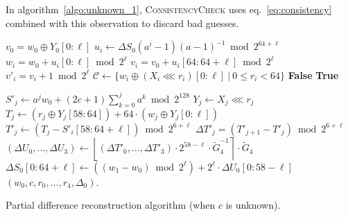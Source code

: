 \documentclass[preprint,svgnames]{iacrtrans}
\begin{document}
In algorithm~\ref{algo:unknown_1}, \textsc{ConsistencyCheck} uses
eq.~\eqref{eq:consistency} combined with this observation to discard bad guesses.

\begin{algorithm}
\begin{algorithmic}[1]
  \State $v_0 = w_0 \oplus Y_0[0:\ell]$ 
  \State $u_i \gets \Delta S_0 (a^i-1)(a-1)^{-1} \bmod 2^{64+\ell}$ 
  \State $w_i = w_0 + u_i[0:\ell] \bmod 2^{\ell}$ 
  \State $v_i = v_0 + u_i[64:64+\ell] \bmod 2^{\ell}$ 
  \State $v'_i = v_i + 1 \bmod 2^{\ell}$
  \State $\mathcal{C} \gets \{ w_i \oplus (X_i \lll r_i)[0:\ell]~|~ 0\leq r_i < 64\}$ 
  \State \Return \textbf{False} 
  \EndIf
  \EndFor
  \State \Return \textbf{True} 
  \EndProcedure

\State 
  
   
  \State $S'_j \gets a^j w_0 + (2c+1) \sum_{k = 0}^j a^k \bmod 2^{128}$ 
   
  \State $Y_j \gets X_j \lll r_j$ 
  \State $T_j \gets \left(r_j \oplus Y_j[58:64]\right) +  64 \cdot \left(w_j \oplus Y_j[0:\ell]\right)$ 
  \State $T'_j \gets (T_j -  S'_i[58:64+\ell]) \bmod 2^{6+\ell}$ 
  \State $\Delta T'_j = (T'_{j+1} - T'_j) \bmod 2^{6 + \ell}$  
  \State $(\Delta U_0, \dots, \Delta U_3) \gets \left\lfloor (\Delta T'_0, \dots, \Delta T'_3) \cdot 2^{58-\ell} \cdot \widetilde G_4^{-1} \right\rceil \cdot \widetilde G_4$ 
  \State $\Delta S_0[0:64+\ell] \gets \left((w_1 - w_0) \bmod 2^{\ell}\right) + 2^{\ell} \cdot \Delta U_0[0:58-\ell]$ 
  \State \Return $(w_0, c, r_0, \dots, r_4, \Delta_0)$.
  \EndIf
  \EndFor
  \EndFor
  \EndProcedure
\end{algorithmic}
\caption{Partial difference reconstruction algorithm (when $c$ is unknown).}
\label{algo:unknown_1}
\end{algorithm}
\end{document}
